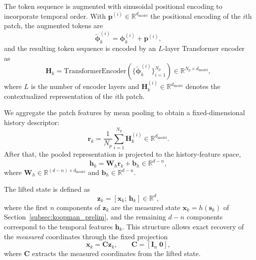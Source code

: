 \documentclass[journal]{IEEEtran}
\newcommand{\vx}{\mathbf{x}}
\newcommand{\vz}{\mathbf{z}}
\newcommand{\vh}{\mathbf{h}}
\newcommand{\vr}{\mathbf{r}}
\newcommand{\vp}{\mathbf{p}}
\newcommand{\vs}{\mathbf{s}}
\newcommand{\vb}{\mathbf{b}}
\newcommand{\vphi}{\boldsymbol{\phi}}
\newcommand{\mC}{\mathbf{C}}
\newcommand{\mW}{\mathbf{W}}
\newcommand{\mH}{\mathbf{H}}
\newcommand{\mI}{\mathbf{I}}
\begin{document}
The token sequence is augmented with sinusoidal positional encoding \cite{vaswani2017attention} to incorporate temporal order. With $\vp^{(i)}\in\mathbb{R}^{d_{\mathrm{model}}}$ the positional encoding of the $i$th patch, the augmented tokens are
\begin{equation}
    \tilde{\vphi}_k^{(i)} = \vphi_k^{(i)} + \vp^{(i)},
    \label{eq:pos_enc_applied}
\end{equation}
and the resulting token sequence is encoded by an $L$-layer Transformer encoder as
\begin{equation}
    \mH_k = \mathrm{TransformerEncoder}\!\left(
        \{\tilde{\vphi}_k^{(i)}\}_{i=1}^{N_p}
    \right) \in \mathbb{R}^{N_p \times d_{\mathrm{model}}},
    \label{eq:transformer_enc}
\end{equation}
where $L$ is the number of encoder layers and $\mH_k^{(i)} \in \mathbb{R}^{d_{\mathrm{model}}}$ denotes the contextualized representation of the $i$th patch.

We aggregate the patch features by mean pooling to obtain a fixed-dimensional history descriptor:
\begin{equation}
    \vr_k = \frac{1}{N_p}\sum_{i=1}^{N_p} \mH_k^{(i)}
    \in \mathbb{R}^{d_{\mathrm{model}}}.
    \label{eq:pooling}
\end{equation}
After that, the pooled representation is projected to the history-feature space,
\begin{equation}
    \vh_k = \mW_h \vr_k + \vb_h \in \mathbb{R}^{d-n},
    \label{eq:history_feature}
\end{equation}
where $\mW_h \in \mathbb{R}^{(d-n)\times d_{\mathrm{model}}}$ and
$\vb_h \in \mathbb{R}^{d-n}$.

The lifted state is defined as
\begin{equation}
    \vz_k = [\vx_k;\,\vh_k] \in \mathbb{R}^{d},
    \label{eq:lifted_state_form}
\end{equation}
where the first $n$ components of $\vz_k$ are the measured state $\vx_k = h(\vs_k)$ of Section~\ref{subsec:koopman_prelim}, and the remaining $d-n$ components correspond to the temporal features $\vh_k$. This structure allows exact recovery of the \emph{measured} coordinates through the fixed projection
\begin{equation}
    \vx_k = \mC \vz_k, \qquad \mC = [\mI_n\;\mathbf{0}],
    \label{eq:decoder_projection}
\end{equation}
where $\mC$ extracts the measured coordinates from the lifted state.
\end{document}
